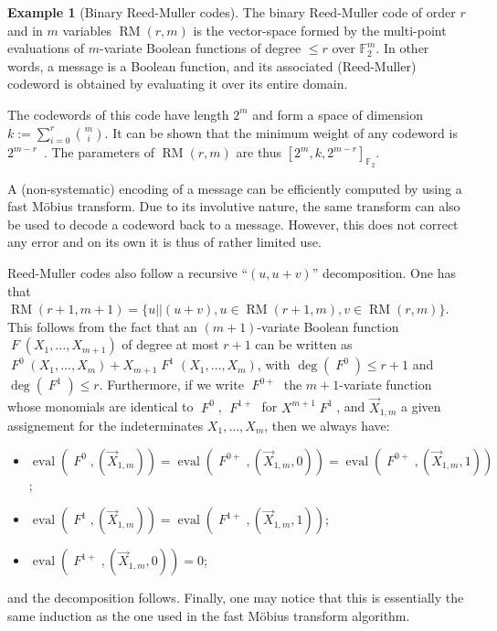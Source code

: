 \documentclass[11pt,a4paper]{article}
\theoremstyle{definition}
\newtheorem{example}{Example}
\DeclareMathOperator\RM{\mathrm{RM}}
\DeclareMathOperator\fun{\mathit{F}}
\DeclareMathOperator\eval{eval}
\newcommand\ftwo{\mathbb{F}_{2}}
\begin{document}
\begin{example}[Binary Reed-Muller codes]
	The binary Reed-Muller code of order $r$ and in $m$ variables $\RM(r,m)$ is the vector-space formed by the multi-point evaluations of $m$-variate Boolean functions of degree $\leq r$ over $\ftwo^m$. In other words,
	a message is a Boolean function, and its associated (Reed-Muller) codeword is obtained by evaluating it over its entire domain.
	
	The codewords of this code have length $2^m$ and form a space of dimension $k := \sum_{i=0}^r\binom{m}{i}$.
	It can be shown that the minimum weight of any codeword is $2^{m-r}$~\cite[Ch. 13, Thm. 3]{MS}. The parameters of $\RM(r,m)$ are thus $[2^m, k, 2^{m-r}]_{\ftwo}$.

	A (non-systematic) encoding of a message can be efficiently computed by using a fast Möbius transform. Due to its involutive nature, the same transform can also be used to decode a codeword back to a message. However, this does not correct any
	error and on its own it is thus of rather limited use.

	Reed-Muller codes also follow a recursive ``$(u,u+v)$'' decomposition. One has that $\RM(r+1,m+1) = \{u||(u+v), u \in \RM(r+1,m), v \in \RM(r,m)\}$. This follows from the fact that an $(m+1)$-variate Boolean function $\fun(X_1,\ldots,X_{m+1})$
	of degree at most $r+1$ can be written as $\fun^{0}(X_1,\ldots,X_m) + X_{m+1}\fun^{1}(X_1,\ldots,X_m)$, with
	$\deg(\fun^0) \leq r+1$ and $\deg(\fun^1) \leq r$. Furthermore, if we write $\fun^{0+}$ the $m+1$-variate function whose monomials are identical
	to $\fun^0$, $\fun^{1+}$ for %
	$X^{m+1}\fun^{1}$,
	and $\vec{X}_{1,m}$ a given assignement for the indeterminates $X_1,\ldots,X_m$,
	then
	we always have:
	\begin{itemize}
		\item $\eval(\fun^0,(\vec{X}_{1,m})) = \eval(\fun^{0+},(\vec{X}_{1,m},0)) = \eval(\fun^{0+},(\vec{X}_{1,m},1))$;
		\item $\eval(\fun^1,(\vec{X}_{1,m})) = \eval(\fun^{1+},(\vec{X}_{1,m},1))$;
		\item $\eval(\fun^{1+},(\vec{X}_{1,m},0)) = 0$;
	\end{itemize}
	and the decomposition follows. Finally, one may notice that this is essentially the same induction as the one used in the fast
	Möbius transform algorithm.
\end{example}
\end{document}
